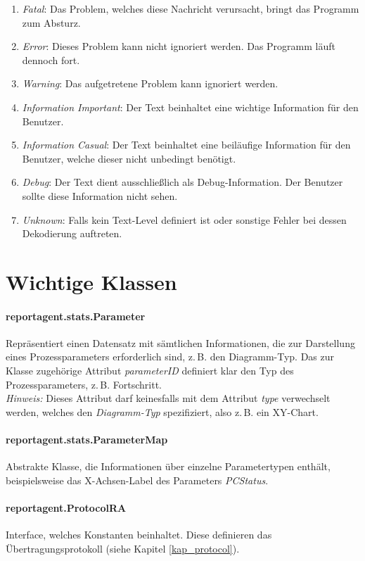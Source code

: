 \documentclass[a4paper,12pt,oneside,openright,onecolumn,final,titlepage,fleqn,ngerman]{scrreprt}
\newcommand{\parag}{\\[2ex]}
\newcommand{\zB}{z.\,B.}
\begin{document}
	\begin{enumerate}
		\item \emph{Fatal}: Das Problem, welches diese Nachricht verursacht, bringt das Programm zum Absturz.
		\item \emph{Error}: Dieses Problem kann nicht ignoriert werden. Das Programm läuft dennoch fort.
		\item \emph{Warning}: Das aufgetretene Problem kann ignoriert werden.
		\item \emph{Information Important}: Der Text beinhaltet eine wichtige Information für den Benutzer.
		\item \emph{Information Casual}: Der Text beinhaltet eine beiläufige Information für den Benutzer, welche dieser nicht unbedingt benötigt.
		\item \emph{Debug}: Der Text dient ausschließlich als Debug-Information. Der Benutzer sollte diese Information nicht sehen.
		\item \emph{Unknown}: Falls kein Text-Level definiert ist oder sonstige Fehler bei dessen Dekodierung auftreten.
	\end{enumerate}
	
	\section{Wichtige Klassen}\label{kap_impCl}
	\paragraph{reportagent.stats.Parameter}
	Repräsentiert einen Datensatz mit sämtlichen Informationen, die zur Darstellung eines Prozessparameters erforderlich sind, \zB{} den Diagramm-Typ. Das zur Klasse zugehörige Attribut \emph{parameterID} definiert klar den Typ des Prozessparameters, \zB{} Fortschritt.\parag{}
	\emph{Hinweis:} Dieses Attribut darf keinesfalls mit dem Attribut \emph{type} verwechselt werden, welches den \emph{Diagramm-Typ} spezifiziert, also \zB{} ein XY-Chart.

	\paragraph{reportagent.stats.ParameterMap}
	Abstrakte Klasse, die Informationen über einzelne Parametertypen enthält, beispielsweise das X-Achsen-Label des Parameters \emph{PCStatus}.

	\paragraph{reportagent.ProtocolRA}
	Interface, welches Konstanten beinhaltet. Diese definieren das Übertragungsprotokoll (siehe Kapitel \ref{kap_protocol}).
\end{document}
